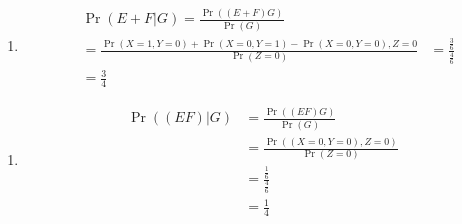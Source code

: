 \documentclass{beamer}
\providecommand{\pr}[1]{\ensuremath{\Pr\left(#1\right)}}
\newcounter{saveenumi}
\newcommand{\conti}{\setcounter{enumi}{\value{saveenumi}}}
\begin{document}
\begin{frame}{}
\begin{enumerate}
\conti
\item 
\begin{align}
&\pr{E+F|G}=\frac{\pr{(E+F)G}}{\pr{G}}\\
&=\frac{\pr{X=1,Y=0}+\pr{X=0,Y=1}-\pr{X=0,Y=0},Z=0}{\pr{Z=0}}
&=\frac{\frac{3}{6}}{\frac{4}{6}}\\
&=\frac{3}{4}
 \end{align}
\end{enumerate}
\end{frame}
	
\begin{frame}{}
\begin{enumerate}
\conti
\item 
\begin{align}
\pr{(EF)|G}&=\frac{\pr{(EF)G}}{\pr{G}}\\
&=\frac{\pr{(X=0,Y=0),Z=0}}{\pr{Z=0}}\\
&=\frac{\frac{1}{6}}{\frac{4}{6}}\\
&=\frac{1}{4}
\end{align}
\end{enumerate}
\end{frame}
\end{document}
